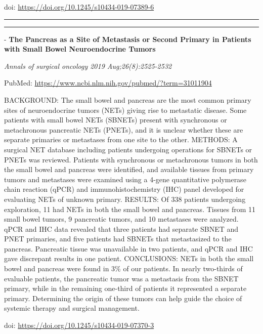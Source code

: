 \documentclass[]{article}
\begin{document}
doi: \url{https://doi.org/10.1245/s10434-019-07389-6}

{}

{}

\begin{center}\rule{0.5\linewidth}{\linethickness}\end{center}

\begin{center}\rule{0.5\linewidth}{\linethickness}\end{center}

 - \textbf{The Pancreas as a Site of Metastasis or Second Primary in
Patients with Small Bowel Neuroendocrine Tumors}

\emph{Annals of surgical oncology 2019 Aug;26(8):2525-2532}

PubMed: \url{https://www.ncbi.nlm.nih.gov/pubmed/?term=31011904}

BACKGROUND: The small bowel and pancreas are the most common primary
sites of neuroendocrine tumors (NETs) giving rise to metastatic disease.
Some patients with small bowel NETs (SBNETs) present with synchronous or
metachronous pancreatic NETs (PNETs), and it is unclear whether these
are separate primaries or metastases from one site to the other.
METHODS: A surgical NET database including patients undergoing
operations for SBNETs or PNETs was reviewed. Patients with synchronous
or metachronous tumors in both the small bowel and pancreas were
identified, and available tissues from primary tumors and metastases
were examined using a 4-gene quantitative polymerase chain reaction
(qPCR) and immunohistochemistry (IHC) panel developed for evaluating
NETs of unknown primary. RESULTS: Of 338 patients undergoing
exploration, 11 had NETs in both the small bowel and pancreas. Tissues
from 11 small bowel tumors, 9 pancreatic tumors, and 10 metastases were
analyzed. qPCR and IHC data revealed that three patients had separate
SBNET and PNET primaries, and five patients had SBNETs that metastasized
to the pancreas. Pancreatic tissue was unavailable in two patients, and
qPCR and IHC gave discrepant results in one patient. CONCLUSIONS: NETs
in both the small bowel and pancreas were found in 3\% of our patients.
In nearly two-thirds of evaluable patients, the pancreatic tumor was a
metastasis from the SBNET primary, while in the remaining one-third of
patients it represented a separate primary. Determining the origin of
these tumors can help guide the choice of systemic therapy and surgical
management.

doi: \url{https://doi.org/10.1245/s10434-019-07370-3}
\end{document}
